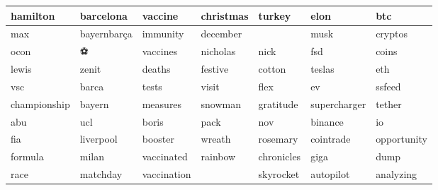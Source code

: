 \begin{tabular}{lllllll}
\toprule
    hamilton &   barcelona &     vaccine & christmas &     turkey &         elon &         btc \\
\midrule
         max & bayernbarça &    immunity &  december &          🦃 &         musk &     cryptos \\
        ocon &           ⚽ &    vaccines &  nicholas &       nick &          fsd &       coins \\
       lewis &       zenit &      deaths &   festive &     cotton &       teslas &         eth \\
         vsc &       barca &       tests &     visit &       flex &           ev &      ssfeed \\
championship &      bayern &    measures &   snowman &  gratitude & supercharger &      tether \\
         abu &         ucl &       boris &      pack &        nov &      binance &          io \\
         fia &   liverpool &     booster &    wreath &   rosemary &    cointrade & opportunity \\
     formula &       milan &  vaccinated &   rainbow & chronicles &         giga &        dump \\
        race &    matchday & vaccination &         🥃 &  skyrocket &    autopilot &   analyzing \\
\bottomrule
\end{tabular}
